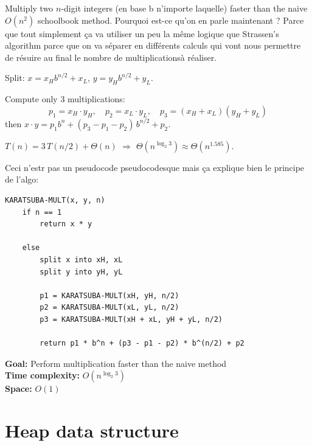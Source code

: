 \documentclass[11pt,a4paper,openany]{book}
\begin{document}
Multiply two $n$-digit integers (en base b n'importe laquelle) faster than the naive $O(n^2)$ schoolbook method.
Pourquoi est-ce qu'on en parle maintenant ? Parce que tout simplement
ça va utiliser un peu la même logique que Strassen's algorithm parce que on va séparer
en différents calculs qui vont nous permettre de résuire au final le nombre de multiplicationsà réaliser.

Split: $x = x_H b^{n/2} + x_L$, $y = y_H b^{n/2} + y_L$.

Compute only 3 multiplications:
\[
  p_1 = x_H \cdot y_H, \quad
  p_2 = x_L \cdot y_L, \quad
  p_3 = (x_H + x_L)(y_H + y_L)
\]
then $x \cdot y = p_1 b^n + (p_3 - p_1 - p_2)\,b^{n/2} + p_2$.

\begin{propbox}[title=Complexity]
$T(n) = 3\,T(n/2) + \Theta(n)$ $\Rightarrow$ $\Theta(n^{\log_2 3}) \approx \Theta(n^{1.585})$.
\end{propbox}

Ceci n'estr  pas un pseudocode pseudocodesque mais ça explique bien le principe
de l'algo: 

\begin{lstlisting}
KARATSUBA-MULT(x, y, n)
    if n == 1
        return x * y

    else
        split x into xH, xL
        split y into yH, yL

        p1 = KARATSUBA-MULT(xH, yH, n/2)
        p2 = KARATSUBA-MULT(xL, yL, n/2)
        p3 = KARATSUBA-MULT(xH + xL, yH + yL, n/2)

        return p1 * b^n + (p3 - p1 - p2) * b^(n/2) + p2
\end{lstlisting}

\textbf{Goal:} Perform multiplication faster than the naive method \\
\textbf{Time complexity:} $O(n^{\log_2 3})$ \\

\textbf{Space:} $O(1)$






\vspace{2cm}








\chapter{Heap data structure}
\end{document}
